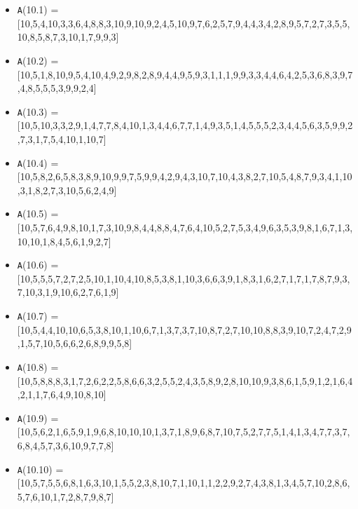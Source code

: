 \documentclass[runningheads,a4paper]{llncs}
\begin{document}
\begin{itemize}
	\item {\texttt A(10.1) = } [10,5,4,10,3,3,6,4,8,8,3,10,9,10,9,2,4,5,10,9,7,6,2,5,7,9,4,4,3,4,2,8,9,5,7,2,7,3,5,5,10,8,5,8,7,3,10,1,7,9,9,3]
	\item {\texttt A(10.2) = } [10,5,1,8,10,9,5,4,10,4,9,2,9,8,2,8,9,4,4,9,5,9,3,1,1,1,9,9,3,3,4,4,6,4,2,5,3,6,8,3,9,7,4,8,5,5,5,3,9,9,2,4]
	\item {\texttt A(10.3) = } [10,5,10,3,3,2,9,1,4,7,7,8,4,10,1,3,4,4,6,7,7,1,4,9,3,5,1,4,5,5,5,2,3,4,4,5,6,3,5,9,9,2,7,3,1,7,5,4,10,1,10,7]
	\item {\texttt A(10.4) = } [10,5,8,2,6,5,8,3,8,9,10,9,9,7,5,9,9,4,2,9,4,3,10,7,10,4,3,8,2,7,10,5,4,8,7,9,3,4,1,10,3,1,8,2,7,3,10,5,6,2,4,9]
	\item {\texttt A(10.5) = } [10,5,7,6,4,9,8,10,1,7,3,10,9,8,4,4,8,8,4,7,6,4,10,5,2,7,5,3,4,9,6,3,5,3,9,8,1,6,7,1,3,10,10,1,8,4,5,6,1,9,2,7]
	\item {\texttt A(10.6) = } [10,5,5,5,7,2,7,2,5,10,1,10,4,10,8,5,3,8,1,10,3,6,6,3,9,1,8,3,1,6,2,7,1,7,1,7,8,7,9,3,7,10,3,1,9,10,6,2,7,6,1,9]
	\item {\texttt A(10.7) = } [10,5,4,4,10,10,6,5,3,8,10,1,10,6,7,1,3,7,3,7,10,8,7,2,7,10,10,8,8,3,9,10,7,2,4,7,2,9,1,5,7,10,5,6,6,2,6,8,9,9,5,8]
	\item {\texttt A(10.8) = } [10,5,8,8,8,3,1,7,2,6,2,2,5,8,6,6,3,2,5,5,2,4,3,5,8,9,2,8,10,10,9,3,8,6,1,5,9,1,2,1,6,4,2,1,1,7,6,4,9,10,8,10]
	\item {\texttt A(10.9) = } [10,5,6,2,1,6,5,9,1,9,6,8,10,10,10,1,3,7,1,8,9,6,8,7,10,7,5,2,7,7,5,1,4,1,3,4,7,7,3,7,6,8,4,5,7,3,6,10,9,7,7,8]
	\item {\texttt A(10.10) = } [10,5,7,5,5,6,8,1,6,3,10,1,5,5,2,3,8,10,7,1,10,1,1,2,2,9,2,7,4,3,8,1,3,4,5,7,10,2,8,6,5,7,6,10,1,7,2,8,7,9,8,7]	
%
\end{itemize}
\end{document}
